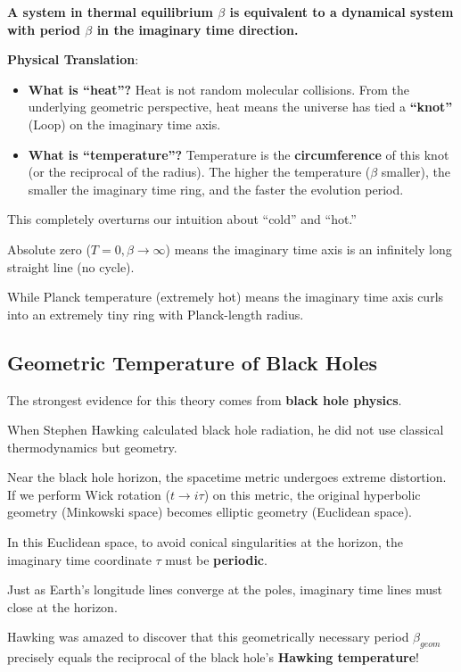 \textbf{A system in thermal equilibrium $\beta$ is equivalent to a dynamical system with period $\beta$ in the imaginary time direction.}

\textbf{Physical Translation}:

\begin{itemize}
\item \textbf{What is ``heat''?} Heat is not random molecular collisions. From the underlying geometric perspective, heat means the universe has tied a \textbf{``knot''} (Loop) on the imaginary time axis.

\item \textbf{What is ``temperature''?} Temperature is the \textbf{circumference} of this knot (or the reciprocal of the radius). The higher the temperature ($\beta$ smaller), the smaller the imaginary time ring, and the faster the evolution period.
\end{itemize}

This completely overturns our intuition about ``cold'' and ``hot.''

Absolute zero ($T=0, \beta \to \infty$) means the imaginary time axis is an infinitely long straight line (no cycle).

While Planck temperature (extremely hot) means the imaginary time axis curls into an extremely tiny ring with Planck-length radius.

\subsection{Geometric Temperature of Black Holes}

The strongest evidence for this theory comes from \textbf{black hole physics}.

When Stephen Hawking calculated black hole radiation, he did not use classical thermodynamics but geometry.

Near the black hole horizon, the spacetime metric undergoes extreme distortion. If we perform Wick rotation ($t \to i\tau$) on this metric, the original hyperbolic geometry (Minkowski space) becomes elliptic geometry (Euclidean space).

In this Euclidean space, to avoid conical singularities at the horizon, the imaginary time coordinate $\tau$ must be \textbf{periodic}.

Just as Earth's longitude lines converge at the poles, imaginary time lines must close at the horizon.

Hawking was amazed to discover that this geometrically necessary period $\beta_{geom}$ precisely equals the reciprocal of the black hole's \textbf{Hawking temperature}!

